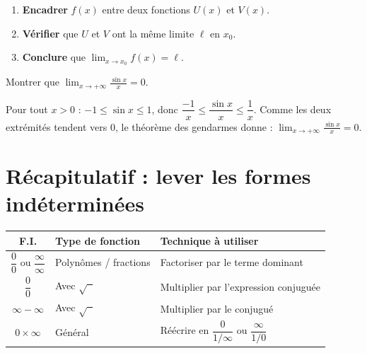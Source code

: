 \begin{methode}
  \begin{enumerate}
    \item \textbf{Encadrer} $f(x)$ entre deux fonctions $U(x)$ et $V(x)$.
    \item \textbf{V\'{e}rifier} que $U$ et $V$ ont la m\^{e}me limite $\ell$ en $x_0$.
    \item \textbf{Conclure} que $\displaystyle\lim_{x \to x_0} f(x) = \ell$.
  \end{enumerate}
\end{methode}

\begin{exemple}
  Montrer que $\displaystyle\lim_{x \to +\infty} \frac{\sin x}{x} = 0$.

  \medskip
  Pour tout $x > 0$ : $-1 \leq \sin x \leq 1$, donc
  $\dfrac{-1}{x} \leq \dfrac{\sin x}{x} \leq \dfrac{1}{x}$.
  Comme les deux extr\'{e}mit\'{e}s tendent vers $0$,
  le th\'{e}or\`{e}me des gendarmes donne :
  $\displaystyle\lim_{x \to +\infty} \frac{\sin x}{x} = 0$.
\end{exemple}

\section{R\'{e}capitulatif : lever les formes ind\'{e}termin\'{e}es}

\begin{methode}
  \bigskip
  \begin{center}
  \renewcommand{\arraystretch}{1.8}
  \begin{tabular}{|c|l|l|}
    \hline
    \textbf{\color{forest}F.I.}
      & \textbf{\color{forest}Type de fonction}
      & \textbf{\color{forest}Technique \`{a} utiliser} \\
    \hline\hline
    $\dfrac{0}{0}$ ou $\dfrac{\infty}{\infty}$
      & Polyn\^{o}mes / fractions
      & Factoriser par le terme dominant \\
    \hline
    $\dfrac{0}{0}$
      & Avec $\sqrt{\phantom{x}}$
      & Multiplier par l'expression conjugu\'{e}e \\
    \hline
    $\infty - \infty$
      & Avec $\sqrt{\phantom{x}}$
      & Multiplier par le conjugu\'{e} \\
    \hline
    $0 \times \infty$
      & G\'{e}n\'{e}ral
      & R\'{e}\'{e}crire en $\dfrac{0}{1/\infty}$ ou $\dfrac{\infty}{1/0}$ \\
    \hline
  \end{tabular}
  \end{center}
\end{methode}

